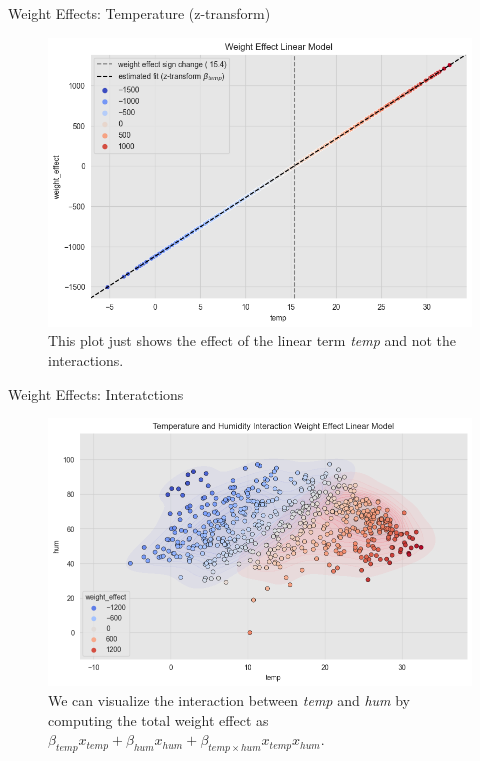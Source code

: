 \documentclass[10pt]{beamer}
\begin{document}
\begin{frame}{Weight Effects: Temperature (z-transform)}
\begin{center}
  \begin{figure}
    \includegraphics[scale=0.48]{images/interpretable_ml_65_0.png}
    \caption{This plot just shows the effect of the linear term {\em temp} and not the interactions.}
  \end{figure}
\end{center}
\end{frame}

\begin{frame}{Weight Effects: Interatctions}
\begin{center}
  \begin{figure}
    \includegraphics[scale=0.48]{images/interpretable_ml_68_0.png}
    \caption{
      We can visualize the interaction between {\em temp} and {\em hum} by computing the total weight effect as $\beta_{temp}x_{temp} + \beta_{hum}x_{hum} + \beta_{temp \times hum}x_{temp}x_{hum}$.
    }
  \end{figure}
\end{center}
\end{frame}
\end{document}
